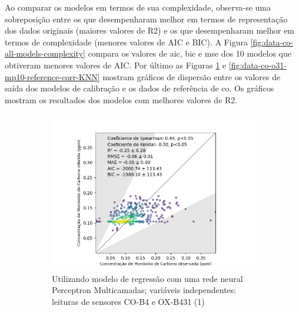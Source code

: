 Ao comparar os modelos em termos de sua complexidade, observa-se uma sobreposição entre os que desempenharam melhor em termos de representação dos dados originais (maiores valores de R2) e os que desempenharam melhor em termos de complexidade (menores valores de AIC e BIC). A Figura \ref{fig:data-co-all-models-complexity} compara os valores de \acrshort{aic}, \acrshort{bic} e \acrshort{mse} dos 10 modelos que obtiveram menores valores de AIC. Por último as Figuras \ref{fig:data-co-o31-reference-corr-MLP} e \ref{fig:data-co-o31-mp10-reference-corr-KNN} mostram gráficos de dispersão entre os valores de saída dos modelos de calibração e os dados de referência de \acrshort{co}. Os gráficos mostram os resultados dos modelos com melhores valores de R2.

\begin{figure}[h]
    \centering
    \caption{Gráfico de dispersão das leituras do múltiplos sensores e a estação de referência para medição de \acrshort{co}}
    \begin{subfigure}{0.49\textwidth}
        \includegraphics[width=\textwidth]{chapters/4-CALIBRAÇÃO MÚLTIPLOS SENSORES/Figuras/CO-co-o31-mlp-Regression.png}
        \caption{Utilizando modelo de regressão com uma rede neural Perceptron Multicamadas; variáveis independentes: leituras de sensores CO-B4 e OX-B431 (1)}
        \label{fig:data-co-o31-reference-corr-MLP}
    \end{subfigure}
    \hfill
    \begin{subfigure}{0.49\textwidth}

\end{subfigure}
\end{figure}

